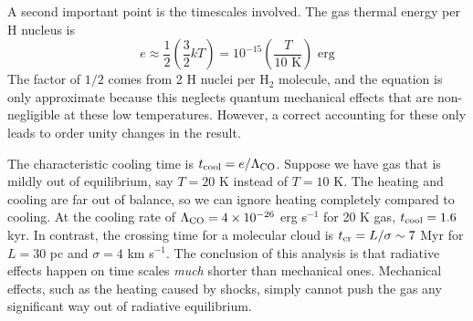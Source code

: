 A second important point is the timescales involved. The gas thermal energy per H nucleus is
\begin{equation}
e \approx \frac{1}{2}\left(\frac{3}{2}k T\right) = 10^{-15} \left(\frac{T}{10\mbox{ K}}\right)\mbox{ erg}
\end{equation}
The factor of $1/2$ comes from 2 H nuclei per H$_2$ molecule, and the equation is only approximate because this neglects quantum mechanical effects that are non-negligible at these low temperatures. However, a correct accounting for these only leads to order unity changes in the result. 

The characteristic cooling time is $t_{\rm cool} = e/\Lambda_{\rm CO}$. Suppose we have gas that is mildly out of equilibrium, say $T=20$ K instead of $T=10$ K. The heating and cooling are far out of balance, so we can ignore heating completely compared to cooling. At the cooling rate of $\Lambda_{\rm CO}=4\times 10^{-26}$ erg s$^{-1}$ for 20 K gas, $t_{\rm cool} = 1.6$ kyr. In contrast, the crossing time for a molecular cloud is $t_{\rm cr} = L/\sigma \sim 7$ Myr for $L=30$ pc and $\sigma = 4$ km s$^{-1}$. The conclusion of this analysis is that radiative effects happen on time scales {\it much} shorter than mechanical ones. Mechanical effects, such as the heating caused by shocks, simply cannot push the gas any significant way out of radiative equilibrium.
